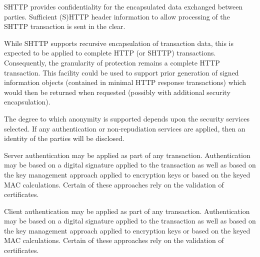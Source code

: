 
  
  SHTTP provides confidentiality for the encapsulated data exchanged
  between parties. Sufficient (S)HTTP header information to allow
  processing of the SHTTP transaction is sent in the clear.

  
  While SHTTP supports recursive encapsulation of transaction data, this is
  expected to be applied to complete HTTP (or SHTTP) transactions.
  Consequently, the granularity of protection remains a complete HTTP
  transaction. This facility could be used to support prior generation of
  signed information objects (contained in minimal HTTP response
  transactions) which would then be returned when requested (possibly with
  additional security encapsulation).

  
  The degree to which anonymity is supported depends upon the security
  services selected. If any authentication or non-repudiation services are
  applied, then an identity of the parties will be disclosed.

  
  Server authentication may be applied as part of any transaction.
  Authentication may be based on a digital signature applied to the
  transaction as well as based on the key management approach applied to
  encryption keys or based on the keyed MAC calculations. Certain of these
  approaches rely on the validation of certificates.

  
  Client authentication may be applied as part of any transaction.
  Authentication may be based on a digital signature applied to the
  transaction as well as based on the key management approach applied to
  encryption keys or based on the keyed MAC calculations. Certain of these
  approaches rely on the validation of certificates.


